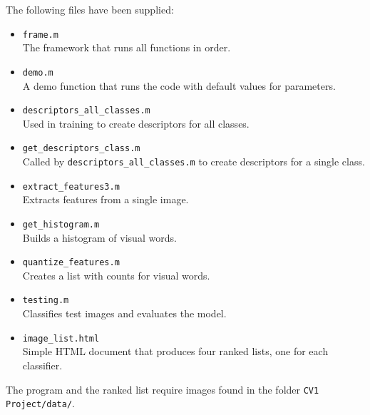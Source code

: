 The following files have been supplied:\\

\begin{itemize}
\item \verb|frame.m|\\
The framework that runs all functions in order.
\item \verb|demo.m|\\
A demo function that runs the code with default values for parameters.
\item \verb|descriptors_all_classes.m|\\
Used in training to create descriptors for all classes.
\item \verb|get_descriptors_class.m|\\
Called by \verb|descriptors_all_classes.m| to create descriptors for a single class.
\item \verb|extract_features3.m|\\
Extracts features from a single image.
\item \verb|get_histogram.m| \\
Builds a histogram of visual words.
\item \verb|quantize_features.m| \\
Creates a list with counts for visual words.
\item \verb|testing.m|\\
Classifies test images and evaluates the model.
\item \verb|image_list.html|\\
Simple HTML document that produces four ranked lists, one for each classifier.
\end{itemize}

The program and the ranked list require images found in the folder \verb|CV1 Project/data/|.